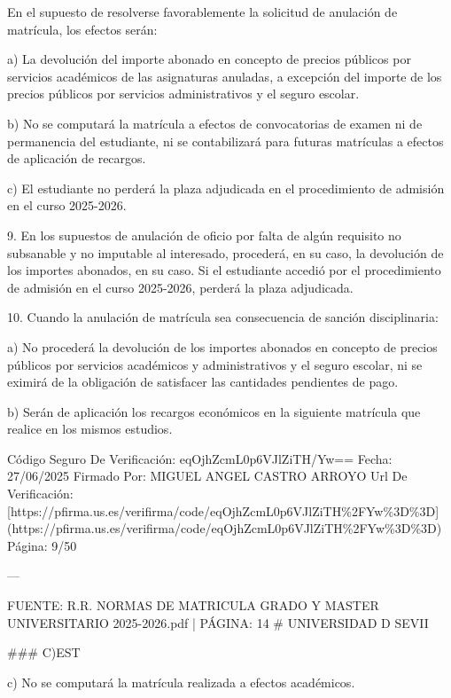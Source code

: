 \documentclass{article}
\begin{document}
\begin{itemize}
\begin{itemize}
\begin{scriptsize}
                  En el supuesto de resolverse favorablemente la solicitud de anulación de matrícula, los efectos serán:

                  a) La devolución del importe abonado en concepto de precios públicos por servicios académicos de las asignaturas anuladas, a excepción del importe de los precios públicos por servicios administrativos y el seguro escolar.

                  b) No se computará la matrícula a efectos de convocatorias de examen ni de permanencia del estudiante, ni se contabilizará para futuras matrículas a efectos de aplicación de recargos.

                  c) El estudiante no perderá la plaza adjudicada en el procedimiento de admisión en el curso 2025-2026.

                  9. En los supuestos de anulación de oficio por falta de algún requisito no subsanable y no imputable al interesado, procederá, en su caso, la devolución de los importes abonados, en su caso. Si el estudiante accedió por el procedimiento de admisión en el curso 2025-2026, perderá la plaza adjudicada.

                  10. Cuando la anulación de matrícula sea consecuencia de sanción disciplinaria:

                  a) No procederá la devolución de los importes abonados en concepto de precios públicos por servicios académicos y administrativos y el seguro escolar, ni se eximirá de la obligación de satisfacer las cantidades pendientes de pago.

                  b) Serán de aplicación los recargos económicos en la siguiente matrícula que realice en los mismos estudios.

                  Código Seguro De Verificación: eqOjhZcmL0p6VJlZiTH/Yw==
                  Fecha: 27/06/2025
                  Firmado Por: MIGUEL ANGEL CASTRO ARROYO
                  Url De Verificación: [https://pfirma.us.es/verifirma/code/eqOjhZcmL0p6VJlZiTH\%2FYw\%3D\%3D](https://pfirma.us.es/verifirma/code/eqOjhZcmL0p6VJlZiTH\%2FYw\%3D\%3D)
                  Página: 9/50

                  ---

                  FUENTE: R.R. NORMAS DE MATRICULA GRADO Y MASTER UNIVERSITARIO 2025-2026.pdf | PÁGINA: 14
                  \# UNIVERSIDAD D SEVII

                  \#\#\# C)EST

                  c) No se computará la matrícula realizada a efectos académicos.


\end{scriptsize}
\end{itemize}
\end{itemize}
\end{document}
